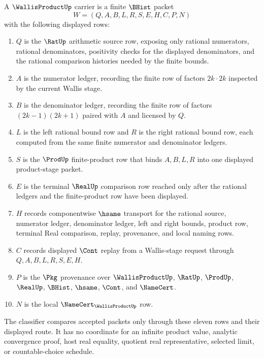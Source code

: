 \begin{definition}
\label{def:wallis-product-carrier}
A $\WallisProductUp$ carrier is a finite $\BHist$ packet
$$
W=(Q,A,B,L,R,S,E,H,C,P,N)
$$
with the following displayed rows:
\begin{enumerate}
\item $Q$ is the $\RatUp$ arithmetic source row, exposing only rational numerators, rational denominators, positivity checks for the displayed denominators, and the rational comparison histories needed by the finite bounds.
\item $A$ is the numerator ledger, recording the finite row of factors $2k\cdot 2k$ inspected by the current Wallis stage.
\item $B$ is the denominator ledger, recording the finite row of factors $(2k-1)(2k+1)$ paired with $A$ and licensed by $Q$.
\item $L$ is the left rational bound row and $R$ is the right rational bound row, each computed from the same finite numerator and denominator ledgers.
\item $S$ is the $\ProdUp$ finite-product row that binds $A,B,L,R$ into one displayed product-stage packet.
\item $E$ is the terminal $\RealUp$ comparison row reached only after the rational ledgers and the finite-product row have been displayed.
\item $H$ records componentwise $\hsame$ transport for the rational source, numerator ledger, denominator ledger, left and right bounds, product row, terminal Real comparison, replay, provenance, and local naming rows.
\item $C$ records displayed $\Cont$ replay from a Wallis-stage request through $Q,A,B,L,R,S,E,H$.
\item $P$ is the $\Pkg$ provenance over $\WallisProductUp$, $\RatUp$, $\ProdUp$, $\RealUp$, $\BHist$, $\hsame$, $\Cont$, and $\NameCert$.
\item $N$ is the local $\NameCert_{\WallisProductUp}$ row.
\end{enumerate}
The classifier compares accepted packets only through these eleven rows and their displayed route. It has no coordinate for an infinite product value, analytic convergence proof, host real equality, quotient real representative, selected limit, or countable-choice schedule.
\end{definition}

